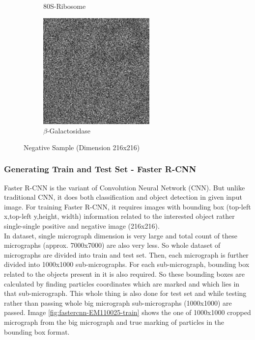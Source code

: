 \documentclass{report}
\begin{document}
\begin{figure}[h]
\begin{subfigure}{.48\textwidth}
\captionsetup{justification=centering}
\caption{ 80S-Ribosome }
\end{subfigure}
\begin{subfigure}{.5\textwidth}
\centering
\includegraphics[width=0.5\linewidth]{neg-EM-10012.png}
\captionsetup{justification=centering}
\caption{$\beta$-Galactosidase }
\end{subfigure}
\caption{Negative Sample (Dimension 216x216)}
\label{fig:Negative-Projection}
\end{figure}

\subsubsection{Generating Train and Test Set - Faster R-CNN}\label{subsec:gen-train-test-faster-rcnn}
Faster R-CNN is the variant of Convolution Neural Network (CNN). But unlike traditional CNN, it does both classification and object detection in given input image. For training  Faster R-CNN, it requires images with bounding box (top-left x,top-left y,height, width) information related to the interested object rather single-single positive and negative image (216x216).\\

In dataset, single micrograph dimension is very large and total count of these micrographs (approx. 7000x7000) are also very less. So whole dataset of micrographs are divided into train and test set. Then, each micrograph is further divided into 1000x1000 sub-micrographs. For each sub-micrograph, bounding box related to the objects present in it is also required. So these bounding boxes are calculated by finding particles coordinates which are marked and which lies in that sub-micrograph. This whole thing is also done for test set and while testing rather than passing whole big micrograph sub-micrographs (1000x1000) are passed. Image \ref{fig:fastercnn-EM110025-train} shows the one of 1000x1000 cropped micrograph from the big micrograph and true marking of particles in the bounding box format.\\
\end{document}
